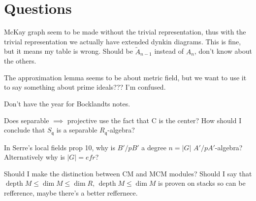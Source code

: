 \documentclass[11pt, a4paper, english]{article}
\theoremstyle{definition}
\DeclareMathOperator{\depth}{depth}
\begin{document}

%
%


\section*{Questions}
McKay graph seem to be made without the trivial representation, thus with the trivial representation we actually have extended dynkin diagrams. This is fine, but it means my table is wrong. Should be $\tilde{A}_{n-1}$ instead of $A_n$, don't know about the others.

The approximation lemma seems to be about metric field, but we want to use it to say something about prime ideals??? I'm confused.

Don't have the year for Bocklandts notes.

Does separable $\implies$ projective use the fact that C is the center? How should I conclude that $S_\mathfrak{q}$ is a separable $R_\mathfrak{q}$-algebra?

In Serre's local fields prop 10, why is $B'/pB'$ a degree $n = |G|$ $A'/pA'$-algebra? Alternatively why is $|G|=efr$?

Should I make the distinction between CM and MCM modules? Should I say that $\depth M \leq \dim M \leq \dim R$, $\depth M \leq \dim M$ is proven on stacks so can be refference, maybe there's a better reffernece.
\end{document}
